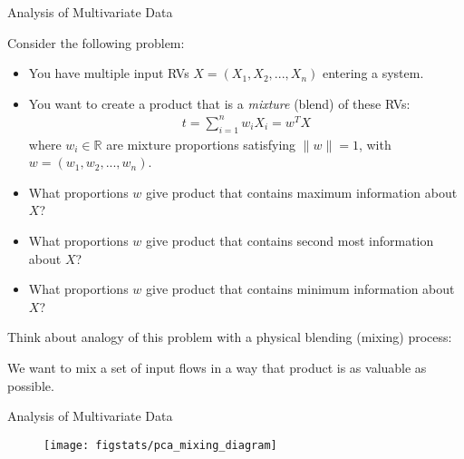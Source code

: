 \documentclass[9pt]{beamer}
\begin{document}
%
\begin{frame}{Analysis of Multivariate Data}

Consider the following problem:
\begin{itemize}
\setlength{\itemsep}{10pt}
\item You have multiple input RVs $X=(X_1,X_2,...,X_n)$ entering a system.
 
\item You want to create a product that is a {\em mixture} (blend) of these RVs:
\begin{align*}
t=\sum_{i=1}^nw_iX_i=w^TX
\end{align*}
where $w_i\in \mathbb{R}$ are  mixture proportions satisfying $\|w\|=1$, with $w=(w_1, w_2,...,w_n)$. 

\item What proportions $w$ give product that contains maximum information about $X$?
\item What proportions $w$ give product that contains second most information about $X$?
\item What proportions $w$ give product that contains minimum information about $X$?

\end{itemize}
\vspace{0.1in}
Think about analogy of this problem with a physical blending (mixing) process: 
\begin{block}{}
We want to mix a set of input flows in a way that product is as valuable as possible.  
\end{block}

\end{frame}

%
\begin{frame}{Analysis of Multivariate Data}

\begin{figure}[!htb]
    \centering
	\texttt{[image: figstats/pca\_mixing\_diagram]}
\end{figure}

\end{frame}
\end{document}
